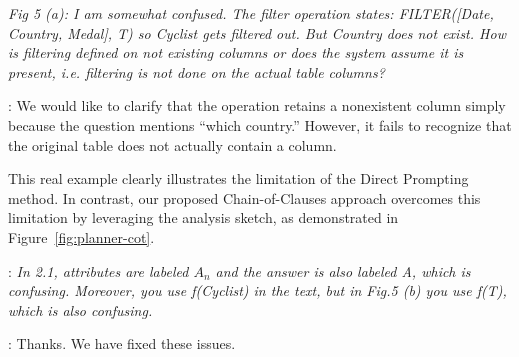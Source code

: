 
\begin{shaded}
{
\emph{
Fig 5 (a): I am somewhat confused. The filter operation states: FILTER([Date, Country, Medal], T) so Cyclist gets filtered out. But Country does not exist. How is filtering defined on not existing columns or does the system assume it is present, i.e. filtering is not done on the actual table columns?}
}
\end{shaded}

: 
We would like to clarify that the  operation retains a nonexistent  column simply because the question mentions ``which country.'' However, it fails to recognize that the original table does not actually contain a  column. 

This real example clearly illustrates the limitation of the Direct Prompting method. In contrast, our proposed Chain-of-Clauses approach overcomes this limitation by leveraging the analysis sketch, as demonstrated in Figure~\ref{fig:planner-cot}.


\begin{shaded}
{
: 
\emph{In 2.1, attributes are labeled $A_n$ and the answer is also labeled A, which is confusing. Moreover, you use f(Cyclist) in the text, but in Fig.5 (b) you use f(T), which is also confusing.
}
}
\end{shaded}

: 
Thanks. We have fixed these issues.

